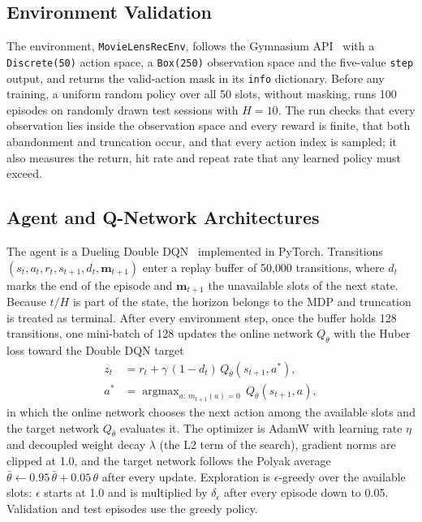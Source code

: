 \subsection{Environment Validation}
\label{sec:envval}

The environment, \texttt{MovieLensRecEnv}, follows the Gymnasium API~\cite{towers2024gymnasium} with a \texttt{Discrete(50)} action space, a \texttt{Box(250)} observation space and the five-value \texttt{step} output, and returns the valid-action mask in its \texttt{info} dictionary. Before any training, a uniform random policy over all 50 slots, without masking, runs 100 episodes on randomly drawn test sessions with $H = 10$. The run checks that every observation lies inside the observation space and every reward is finite, that both abandonment and truncation occur, and that every action index is sampled; it also measures the return, hit rate and repeat rate that any learned policy must exceed.

\subsection{Agent and Q-Network Architectures}
\label{sec:agent}

The agent is a Dueling Double DQN~\cite{mnih2015human,van2016deep,wang2016dueling} implemented in PyTorch. Transitions $(s_t, a_t, r_t, s_{t+1}, d_t, \mathbf{m}_{t+1})$ enter a replay buffer of 50{,}000 transitions, where $d_t$ marks the end of the episode and $\mathbf{m}_{t+1}$ the unavailable slots of the next state. Because $t/H$ is part of the state, the horizon belongs to the MDP and truncation is treated as terminal. After every environment step, once the buffer holds 128 transitions, one mini-batch of 128 updates the online network $Q_\theta$ with the Huber loss toward the Double DQN target
\begin{equation}
\begin{aligned}
z_t &= r_t + \gamma\,(1-d_t)\,Q_{\bar{\theta}}(s_{t+1}, a^{*}),\\
a^{*} &= \mathop{\arg\max}\nolimits_{a:\,m_{t+1}(a)=0}\, Q_{\theta}(s_{t+1}, a),
\end{aligned}
\label{eq:target}
\end{equation}
in which the online network chooses the next action among the available slots and the target network $Q_{\bar{\theta}}$ evaluates it. The optimizer is AdamW with learning rate $\eta$ and decoupled weight decay $\lambda$ (the L2 term of the search), gradient norms are clipped at 1.0, and the target network follows the Polyak average $\bar{\theta} \leftarrow 0.95\,\bar{\theta} + 0.05\,\theta$ after every update. Exploration is $\epsilon$-greedy over the available slots: $\epsilon$ starts at 1.0 and is multiplied by $\delta_\epsilon$ after every episode down to 0.05. Validation and test episodes use the greedy policy.


